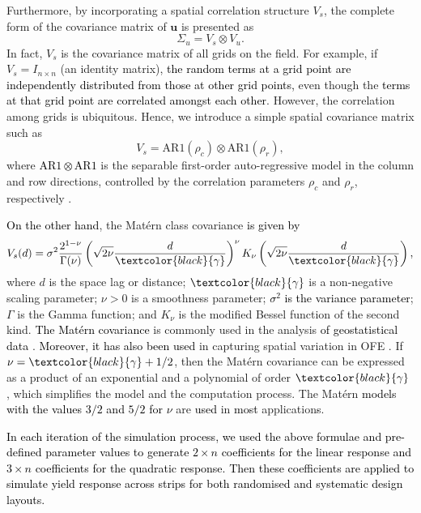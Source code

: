 \documentclass[a4paper]{article} 	%
\newcommand{\Matern}{Mat\'ern }
\newcommand{\AR}{\mathrm{AR1}}
\newcommand{\revision}[1]{\textcolor{black}{#1}}
\newcommand{\zc}[1]{\textcolor{black}{#1}}
\begin{document}
Furthermore, by incorporating a spatial correlation structure $V_s$, the complete form of the covariance matrix of $\bm{u}$ is presented as 
\begin{equation}\label{eq:varu}
	\Sigma_u = V_s \otimes V_u. 
\end{equation}
In fact, $V_s$ is the covariance matrix of all grids on the field. For example, if $V_s=I_{n\times n}$ (an identity matrix), \revision{the random terms at a grid point are independently distributed from those at other grid points,} even though the \revision{terms at that grid point are correlated amongst each other}. However, the correlation among grids is ubiquitous. Hence, we introduce a simple spatial covariance matrix such as 
\begin{equation}\label{eq:ar1cov}
	V_s = \AR(\rho_c)\otimes \AR(\rho_r),
\end{equation}
where \revision{$\AR \otimes \AR$} is the separable first-order auto-regressive model in the column and row directions, controlled by the correlation parameters $\rho_c$ and $\rho_r$, respectively \parencite{Butler2017ASRemlR}. 

\revision{On the other hand}, the \Matern class covariance \revision{is given by}
\begin{equation}\label{eq:matcov}
V_s(d) = \sigma^2 \frac{2^{1-\nu}}{\Gamma(\nu)} \left( \sqrt{2\nu} \frac{d}{\zc{\gamma}}\right)^\nu K_\nu\left( \sqrt{2\nu} \frac{d}{\zc{\gamma}}\right),
\end{equation}
 where $d$ is the space lag or distance; $\zc{\gamma}$ is a non-negative scaling parameter; $\nu> 0$ is a smoothness parameter; \revision{$\sigma^2$ is the variance parameter}; $\Gamma$ is the Gamma function; and $K_\nu$ is the modified Bessel function of the second kind. \revision{The \Matern covariance} is commonly used in the analysis \revision{of geostatistical data} \parencite{Cressie1999Classes}. \revision{Moreover, it has also been used} in capturing spatial variation in OFE \parencite{Selle2019Flexible}. If $\nu = \zc{\gamma} + 1/2$, then the \Matern covariance can be expressed as a product of an exponential and a polynomial of order $\zc{\gamma}$ \parencite{Pandit2019Comparative, Abramowitz1974Handbook}, which simplifies the model and the computation process. The \Matern \revision{models} \revision{with the values $3/2$ and $5/2$ for $\nu$} are \revision{used} in \revision{most} application\revision{s}. 


\zc{In each iteration of the simulation process, we used the above formulae and pre-defined parameter values to generate $2\times n$ coefficients for the linear response and $3\times n$ coefficients for the quadratic response. Then these coefficients are applied to simulate yield response across strips for both  randomised and systematic design layouts.}
\end{document}
